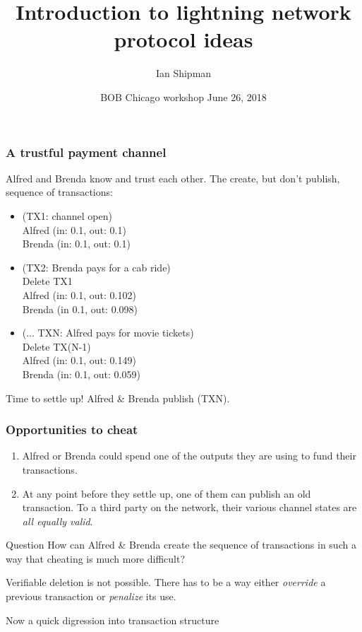 \documentclass{beamer}
\title{Introduction to lightning network protocol ideas}
\author{Ian Shipman}
\date{BOB Chicago {workshop} June 26, 2018}
\begin{document}
\frame{\titlepage}
\begin{frame}
	\frametitle{A trustful payment channel}
	Alfred and Brenda know and trust each other.  The create, but don't publish, 
	sequence of transactions:
	\begin{itemize}
		\item (TX1: channel open) \\ 
			Alfred (in: 0.1, out: 0.1) \\
			Brenda (in: 0.1, out: 0.1)
		\item (TX2: Brenda pays for a cab ride) \\
			Delete TX1 \\
			Alfred (in: 0.1, out: 0.102) \\
			Brenda (in 0.1, out: 0.098)
		\item (... TXN: Alfred pays for movie tickets) \\
			Delete TX(N-1) \\ 
			Alfred (in: 0.1, out: 0.149) \\
			Brenda (in: 0.1, out: 0.059)
	\end{itemize}
	Time to settle up!  Alfred \& Brenda publish (TXN).
\end{frame}
\begin{frame}
	\frametitle{Opportunities to cheat}
	\begin{enumerate}
		\item Alfred or Brenda could spend one of the outputs they are using to 
			fund their transactions.
		\item At any point before they settle up, one of them can 
			publish an old transaction.  To a third party on the network, their 
			various channel states are \emph{all equally valid}.  
	\end{enumerate}
	\pause
	\begin{block}{Question}
		How can Alfred \& Brenda create the sequence of transactions in such a way 
		that cheating is much more difficult?
	\end{block}
	\pause
	Verifiable deletion is not possible.  There has to be a way either 
	\emph{override} a previous transaction or \emph{penalize} its use.
\end{frame}
\begin{frame}
	Now a quick digression into transaction structure
\end{frame}
\end{document}
